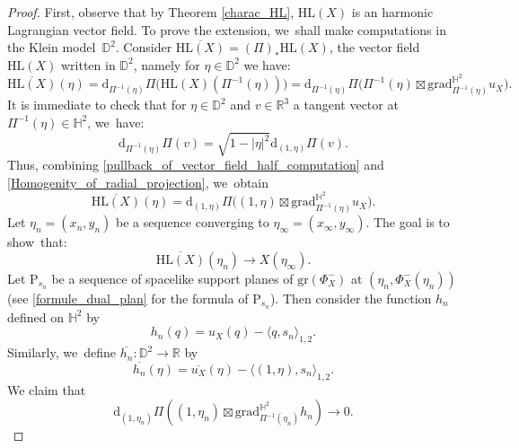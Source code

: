 \documentclass[JEP,XML,SOM,Unicode,NoEqCountersInSection, NoFloatCountersInSection,published]{cedram}
\theoremstyle{plain}
\theoremstyle{definition}
\newcommand{\grad}{\mathrm{grad}^{\mathbb{H}^2}}
\newcommand{\inner}[1] {\langle #1 \rangle}
\begin{document}
\begin{proof}
First, observe that by Theorem \ref{charac_HL}, $\mathrm{HL}(X)$ is an harmonic Lagrangian vector field. To prove the extension, we~shall make computations in the Klein model~$\mathbb{D}^2$. Consider $\overline{\mathrm{HL}(X)}=(\Pi)_*\mathrm{HL}(X)$, the vector field $\mathrm{HL}(X)$ written in $\mathbb{D}^2$, namely for $\eta\in\mathbb{D}^2$ we have:
\begin{equation}\label{pullback_of_vector_field_half_computation}
\overline{\mathrm{HL}(X)}(\eta)=\mathrm{d}_{\Pi^{-1}(\eta)}\Pi\bigl(\mathrm{HL}(X)(\Pi^{-1}(\eta)) \bigr)=\mathrm{d}_{\Pi^{-1}(\eta)}\Pi\bigl(\Pi^{-1}(\eta)\boxtimes\grad_{\Pi^{-1}(\eta)} u_X \bigr).
\end{equation}
It is immediate to check that for $\eta\in \mathbb{D}^2$ and $v\in \mathbb{R}^3$ a tangent vector at $\Pi^{-1}(\eta)\in \mathbb{H}^2$, we~have:
\begin{equation}\label{Homogenity_of_radial_projection}
\mathrm{d}_{\Pi^{-1}(\eta)}\Pi(v)=\sqrt{1-\lvert\eta\rvert^2}\mathrm{d}_{(1,\eta)}\Pi(v).
\end{equation}
Thus, combining \eqref{pullback_of_vector_field_half_computation} and \eqref{Homogenity_of_radial_projection}, we~obtain
\begin{equation}\label{pullback_of_vector_field}
\overline{\mathrm{HL}(X)}(\eta)=\mathrm{d}_{(1,\eta)}\Pi\bigl((1,\eta)\boxtimes\grad_{\Pi^{-1}(\eta)} u_X \bigr).
\end{equation}
Let $\eta_n\!=\!(x_n,y_n)$ be a sequence converging to $\eta_{\infty}\!=\!(x_{\infty},y_{\infty})$. The goal is to show~that:
\begin{equation}\label{goal}
\overline{\mathrm{HL}(X)}(\eta_n)\to X(\eta_{\infty}).
\end{equation}
Let $\mathrm{P}_{s_n}$ be a sequence of spacelike support planes of $\mathrm{gr}(\Phi_X^-)$ at $(\eta_n,\Phi_X^-(\eta_n))$ (see \eqref{formule_dual_plan} for the formula of $\mathrm{P}_{s_n}$). Then consider the function $h_n$ defined on $\mathbb{H}^2$ by
\[
h_n(q)=u_X(q)-\inner{q,s_n}_{1,2}.
\]
Similarly, we~define $\overline{h_n}:\mathbb{D}^2\to\mathbb{R}$ by \begin{equation}\label{eq_h_n_positive}
\overline{h_n}(\eta)=\overline{u_X}(\eta)-\inner{(1,\eta),s_n}_{1,2}.
\end{equation} We claim that
\begin{equation}\label{claiminextension}
\mathrm{d}_{(1,\eta_n)}\Pi\left((1,\eta_n)\boxtimes\grad_{\Pi^{-1}(\eta_n)} h_n \right)\to 0.
\end{equation}

\end{proof}
\end{document}
